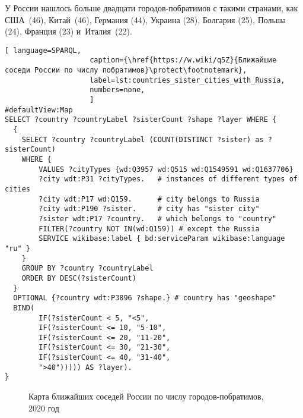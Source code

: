 У России нашлось больше двадцати городов-побратимов с такими странами, 
как США~(46), Китай~(46), Германия (44), Украина (28), Болгария (25), 
Польша (24), Франция (23) и~Италия~(22).


\begin{lstlisting}[ language=SPARQL, 
                    caption={\href{https://w.wiki/q5Z}{Ближайшие соседи России по числу побратимов}\protect\footnotemark},
                    label=lst:countries_sister_cities_with_Russia,
                    numbers=none,
                    ]
#defaultView:Map
SELECT ?country ?countryLabel ?sisterCount ?shape ?layer WHERE {
  { 
    SELECT ?country ?countryLabel (COUNT(DISTINCT ?sister) as ?sisterCount) 
    WHERE {  
        VALUES ?cityTypes {wd:Q3957 wd:Q515 wd:Q1549591 wd:Q1637706}
        ?city wdt:P31 ?cityTypes.   # instances of different types of cities
        ?city wdt:P17 wd:Q159.      # city belongs to Russia
        ?city wdt:P190 ?sister.     # city has "sister city"
        ?sister wdt:P17 ?country.   # which belongs to "country"
        FILTER(?country NOT IN(wd:Q159)) # except the Russia
        SERVICE wikibase:label { bd:serviceParam wikibase:language "ru" }
    }
    GROUP BY ?country ?countryLabel
    ORDER BY DESC(?sisterCount)
  }
  OPTIONAL {?country wdt:P3896 ?shape.} # country has "geoshape"
  BIND(
	    IF(?sisterCount < 5, "<5",
		IF(?sisterCount <= 10, "5-10",
		IF(?sisterCount <= 20, "11-20",
		IF(?sisterCount <= 30, "21-30",
		IF(?sisterCount <= 40, "31-40",
		">40"))))) AS ?layer).
}
\end{lstlisting}

\begin{figure*}
{
\setlength{\fboxsep}{0pt}%
\setlength{\fboxrule}{1pt}%
}
	\caption{Карта ближайших соседей России по числу городов-побратимов,\\2020 год}
	\label{fig:Map_closest_neighbours_Russia}
\end{figure*}







